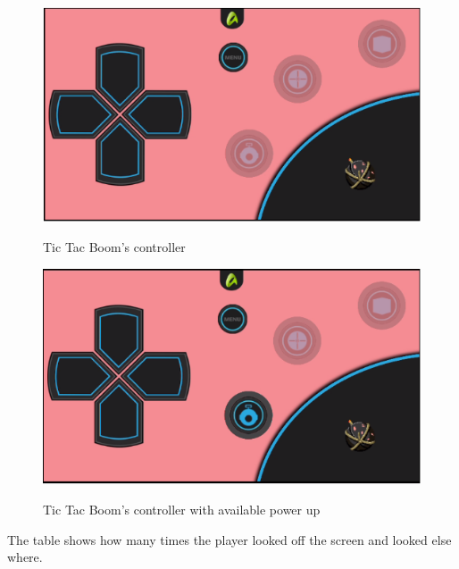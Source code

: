 \begin{figure}
\centering
\includegraphics[width=\textwidth]{figures/TTBcontrol} \label{fig:TTB1}
\caption{Tic Tac Boom's controller}
\end{figure}

\begin{figure}
\centering
\includegraphics[width=\textwidth]{figures/TTBpowerUp} \label{fig:TTB2}
\caption{Tic Tac Boom's controller with available power up}
\end{figure}

The table shows how many times the player looked off the screen and looked else where. 

